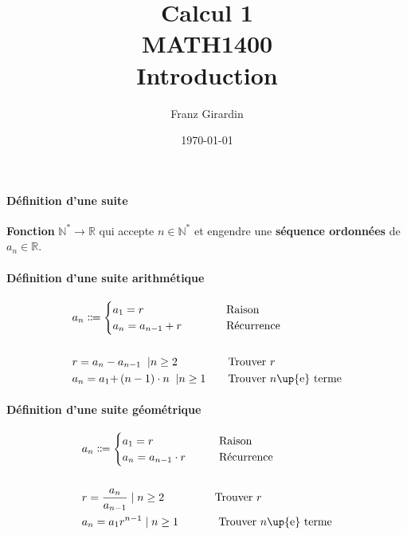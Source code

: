\documentclass[2pt]{report}
\title{\Huge{Calcul 1}\\{MATH1400}\\{\textbf{Introduction}}}
\author{\huge{Franz Girardin}}
\date{\today}
\begin{document}
\maketitle

\pagebreak

\pagebreak
\begin{multicols*}{3}


    \footnotesize

    \paragraph{Définition d'une suite}
        \textbf{Fonction} $\mathbb{N}^* 
        \rightarrow \mathbb{R}$ qui accepte 
        $n \in \mathbb{N}^*$ et engendre une \textbf{séquence ordonnées} de $a_n \in \mathbb{R}$. 


    \paragraph{Définition d'une suite arithmétique}    
        \begin{align*}
                &a_n \Coloneqq 
                \begin{cases}
                    a_1 = r  &\omit\quad\quad\quad Raison\\  
                    a_{n} = a_{n-1} + r &\omit\hfill \quad\quad\quad Récurrence
                \end{cases}
                \\\\
                &r = a_n - a_{n-1} \;\;| n \geq 2  
                \quad\quad\quad\quad\;\;\text{Trouver $r$} \\
                &a_n = a_1 \text{+} \left(n - 1\right)\cdot{n}  \;\;|n \geq 1  
                \quad\quad\text{Trouver $n$\up{e} terme}
        \end{align*}
    \paragraph{Définition d'une suite géométrique}
        \begin{align*}
                &a_n \Coloneqq 
                \begin{cases}
                    a_1 = r  &\omit\quad\quad Raison\\  
                    a_{n} = a_{n-1} \cdot r &\omit\hfill 
                    \quad\quad Récurrence
                \end{cases}
                \\\\ 
                &r = \frac{a_n}{a_{n-1}} \; | \; n \geq 2
                \quad\quad\quad\quad\;\;\text{Trouver $r$} \\ 
                &a_n = a_1r^{n - 1} \; | \; n \geq 1
                \text{\quad\quad\quad\; Trouver $n$\up{e} terme}
        \end{align*}







\end{multicols*}
\end{document}
